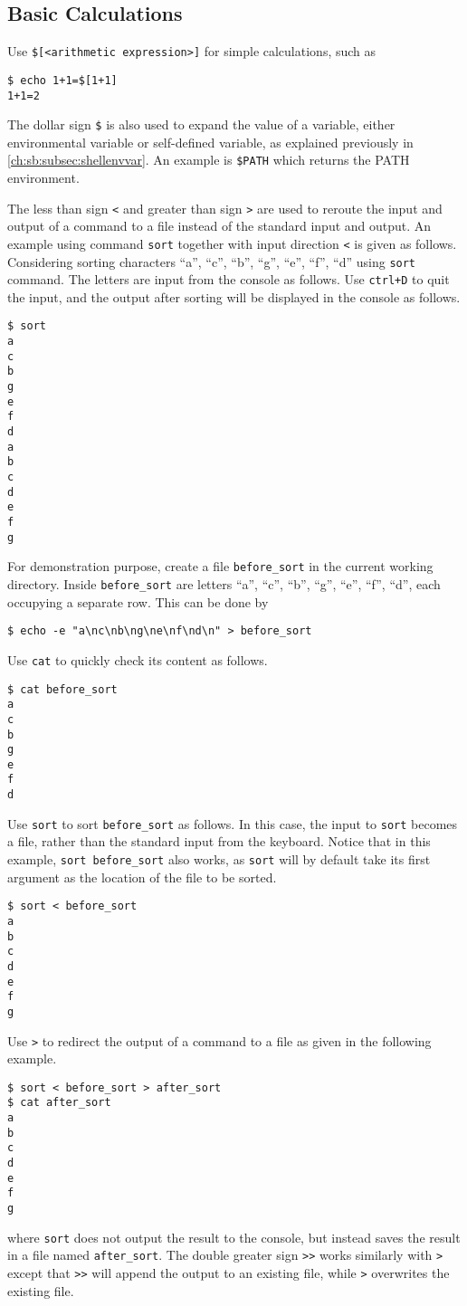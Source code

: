 \subsection{Basic Calculations}

Use \verb|$[<arithmetic expression>]| for simple calculations, such as
\begin{lstlisting}
$ echo 1+1=$[1+1]
1+1=2
\end{lstlisting}

The dollar sign \verb|$| is also used to expand the value of a variable, either environmental variable or self-defined variable, as explained previously in \ref{ch:sb:subsec:shellenvvar}. An example is \verb|$PATH| which returns the PATH environment.

The less than sign \verb|<| and greater than sign \verb|>| are used to reroute the input and output of a command to a file instead of the standard input and output. An example using command \verb|sort| together with input direction \verb|<| is given as follows. Considering sorting characters ``a'', ``c'', ``b'', ``g'', ``e'', ``f'', ``d'' using \verb|sort| command. The letters are input from the console as follows. Use \verb|ctrl+D| to quit the input, and the output after sorting will be displayed in the console as follows.
\begin{lstlisting}
$ sort
a
c
b
g
e
f
d
a
b
c
d
e
f
g
\end{lstlisting}
For demonstration purpose, create a file \verb|before_sort| in the current working directory. Inside \verb|before_sort| are letters ``a'', ``c'', ``b'', ``g'', ``e'', ``f'', ``d'', each occupying a separate row. This can be done by 
\begin{lstlisting}
$ echo -e "a\nc\nb\ng\ne\nf\nd\n" > before_sort
\end{lstlisting}
Use \verb|cat| to quickly check its content as follows.
\begin{lstlisting}
$ cat before_sort
a
c
b
g
e
f
d
\end{lstlisting}
Use \verb|sort| to sort \verb|before_sort| as follows. In this case, the input to \verb|sort| becomes a file, rather than the standard input from the keyboard. Notice that in this example, \verb|sort before_sort| also works, as \verb|sort| will by default take its first argument as the location of the file to be sorted.
\begin{lstlisting}
$ sort < before_sort
a
b
c
d
e
f
g
\end{lstlisting}
Use \verb|>| to redirect the output of a command to a file as given in the following example.
\begin{lstlisting}
$ sort < before_sort > after_sort
$ cat after_sort
a
b
c
d
e
f
g
\end{lstlisting}
where \verb|sort| does not output the result to the console, but instead saves the result in a file named \verb|after_sort|. The double greater sign \verb|>>| works similarly with \verb|>| except that \verb|>>| will append the output to an existing file, while \verb|>| overwrites the existing file.

